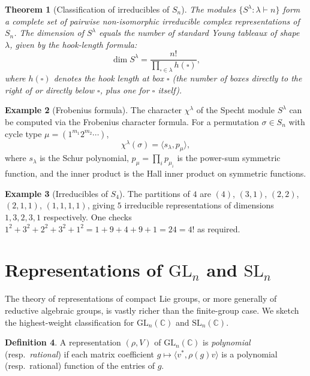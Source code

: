 \documentclass[12pt,a4paper]{amsart}
\newtheorem{theorem}{Theorem}[section]
\theoremstyle{definition}
\newtheorem{definition}[theorem]{Definition}
\newtheorem{example}[theorem]{Example}
\begin{document}
\begin{theorem}[Classification of irreducibles of $S_n$]
\label{thm:sn_class}
The modules $\{S^\lambda : \lambda \vdash n\}$ form a complete set of pairwise
non-isomorphic irreducible complex representations of $S_n$.  The dimension of
$S^\lambda$ equals the number of standard Young tableaux of shape $\lambda$,
given by the \emph{hook-length formula}:
\[
    \dim S^\lambda = \frac{n!}{\prod_{\square \in \lambda} h(\square)},
\]
where $h(\square)$ denotes the \emph{hook length} at box $\square$ (the number
of boxes directly to the right of or directly below $\square$, plus one for
$\square$ itself).
\end{theorem}

\begin{example}[Frobenius formula]
The character $\chi^\lambda$ of the Specht module $S^\lambda$ can be computed via
the Frobenius character formula.  For a permutation $\sigma \in S_n$ with cycle
type $\mu = (1^{m_1} 2^{m_2} \cdots)$,
\[
    \chi^\lambda(\sigma) = \langle s_\lambda, p_\mu \rangle,
\]
where $s_\lambda$ is the Schur polynomial, $p_\mu = \prod_i p_{\mu_i}$ is the
power-sum symmetric function, and the inner product is the Hall inner product on
symmetric functions.
\end{example}

\begin{example}[Irreducibles of $S_4$]
The partitions of $4$ are $(4)$, $(3,1)$, $(2,2)$, $(2,1,1)$, $(1,1,1,1)$,
giving $5$ irreducible representations of dimensions $1, 3, 2, 3, 1$ respectively.
One checks $1^2 + 3^2 + 2^2 + 3^2 + 1^2 = 1+9+4+9+1 = 24 = 4!$ as required.
\end{example}

\section{Representations of $\mathrm{GL}_n$ and $\mathrm{SL}_n$}
\label{sec:gln}

The theory of representations of compact Lie groups, or more generally of
reductive algebraic groups, is vastly richer than the finite-group case.  We
sketch the highest-weight classification for $\mathrm{GL}_n(\mathbb{C})$ and
$\mathrm{SL}_n(\mathbb{C})$.

\begin{definition}
A representation $(\rho, V)$ of $\mathrm{GL}_n(\mathbb{C})$ is
\emph{polynomial} (resp.\ \emph{rational}) if each matrix coefficient
$g \mapsto \langle v^*, \rho(g)v\rangle$ is a polynomial (resp.\ rational) function
of the entries of $g$.
\end{definition}
\end{document}
